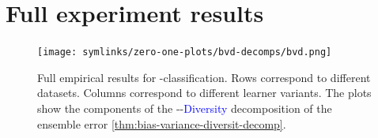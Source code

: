\documentclass[
    a4paper, %
	fontsize=10pt, %
	twoside=false, %
]{kaobook}
\begin{document}
\appendix %





\chapter{Full experiment results}
\label{sec:drf-full-results}




\begin{figure}[hb]
	\texttt{[image: symlinks/zero-one-plots/bvd-decomps/bvd.png]}
	\caption{
        Full empirical results for \zeroone-classification. Rows correspond to different datasets. Columns correspond to different learner variants. The plots show the components of the 
        \textcolor{orange}{}-\textcolor{green}{}-\textcolor{blue}{Diversity} decomposition of the ensemble error \ref{thm:bias-variance-diversit-decomp}.
    }
    \label{fig:zero-one-bvd-plots}
\end{figure}
\end{document}

